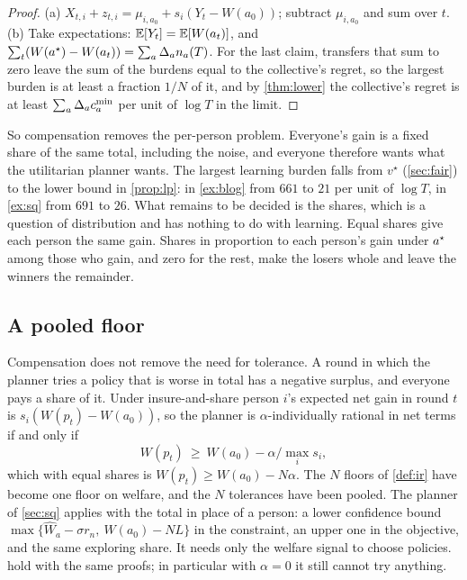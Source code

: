 \begin{proof}
(a) $X_{t,i}+z_{t,i}=\mu_{i,a_0}+s_i(Y_t-W(a_0))$; subtract $\mu_{i,a_0}$ and sum over $t$. (b) Take expectations: $\mathbb{E}[Y_t]=\mathbb{E}[W(a_t)]$, and $\sum_t(W(a^\star)-W(a_t))=\sum_a\Delta_an_a(T)$. For the last claim, transfers that sum to zero leave the sum of the burdens equal to the collective's regret, so the largest burden is at least a fraction $1/N$ of it, and by \cref{thm:lower} the collective's regret is at least $\sum_a\Delta_ac^{\min}_a$ per unit of $\log T$ in the limit.
\end{proof}

So compensation removes the per-person problem. Everyone's gain is a fixed share of the same total, including the noise, and everyone therefore wants what the utilitarian planner wants. The largest learning burden falls from $v^\star$ (\cref{sec:fair}) to the lower bound in \cref{prop:lp}: in \cref{ex:blog} from $661$ to $21$ per unit of $\log T$, in \cref{ex:sq} from $691$ to $26$. What remains to be decided is the shares, which is a question of distribution and has nothing to do with learning. Equal shares give each person the same gain. Shares in proportion to each person's gain under $a^\star$ among those who gain, and zero for the rest, make the losers whole and leave the winners the remainder.

\subsection{A pooled floor}

Compensation does not remove the need for tolerance. A round in which the planner tries a policy that is worse in total has a negative surplus, and everyone pays a share of it. Under insure-and-share person $i$'s expected net gain in round $t$ is $s_i(W(p_t)-W(a_0))$, so the planner is $\alpha$-individually rational in net terms if and only if
\[
  W(p_t)\ \ge\ W(a_0)-\alpha/\max_is_i ,
\]
which with equal shares is $W(p_t)\ge W(a_0)-N\alpha$. The $N$ floors of \cref{def:ir} have become one floor on welfare, and the $N$ tolerances have been pooled. The planner of \cref{sec:sq} applies with the total in place of a person: a lower confidence bound $\max\{\hat W_a-\sigma r_n,\ W(a_0)-NL\}$ in the constraint, an upper one in the objective, and the same exploring share. It needs only the welfare signal to choose policies.  hold with the same proofs; in particular with $\alpha=0$ it still cannot try anything.

